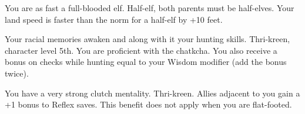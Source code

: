 {You are as fast a full-blooded elf.}
{Half-elf, both parents must be half-elves.}
{Your land speed is faster than the norm for a half-elf by +10 feet.}
{}{}

{Your racial memories awaken and along with it your hunting skills.}
{Thri-kreen, character level 5th.}
{You are proficient with the chatkcha. You also receive a bonus on  checks while hunting equal to your Wisdom modifier (add the bonus twice).}
{}{}

{You have a very strong clutch mentality.}
{Thri-kreen.}
{Allies adjacent to you gain a +1 bonus to Reflex saves. This benefit does not apply when you are flat-footed.}
{}{}
